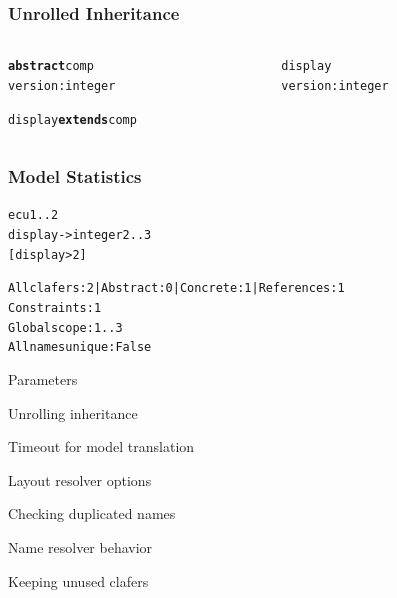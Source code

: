 \documentclass[table,15pt,t]{beamer}
\newcommand{\vmiddle}[1]{
  \vspace{\stretch{1}}
  #1
  \vspace{\stretch{1}}
}
\newcommand{\mlist}[1]{
\vmiddle{
  \begin{list}{}{}
    #1
  \end{list}
  }
}
\newcounter{i}
\begin{document}
\begin{frame}[fragile]
  \frametitle{Unrolled Inheritance}
  \begin{columns}
    \begin{column}{0.5\textwidth}
      \begin{alltt}
        \begin{small}
\textbf{abstract} \textsf{comp}
  \textsf{version} : \textsf{integer}

\textsf{display} \textbf{extends} \textsf{comp}
        \end{small}
      \end{alltt}
    \end{column}
\pause
    \begin{column}{0.5\textwidth}
      \begin{alltt}
        \begin{small}
\textsf{display}
  \textsf{version} : \textsf{integer}
        \end{small}
      \end{alltt}
    \end{column}
  \end{columns}
\end{frame}

\begin{frame}[fragile]
  \frametitle{Model Statistics}
      \begin{alltt}
        \begin{small}
\textsf{ecu} 1..2
  \textsf{display} -> \textsf{integer} 2..3
  \textsf{[display > 2]}
        \end{small}
      \end{alltt}
\pause
      \begin{alltt}
        \begin{small}
All clafers: 2 | Abstract: 0 | Concrete: 1 | References: 1
Constraints: 1
Global scope: 1..3
All names unique: False
        \end{small}
      \end{alltt}
\end{frame}

\begin{frame}{Parameters}
 \mlist{
    \item Unrolling inheritance
    \item Timeout for model translation
    \item Layout resolver options
    \item Checking duplicated names
    \item Name resolver behavior
    \item Keeping unused clafers
 }
\end{frame}
\end{document}
